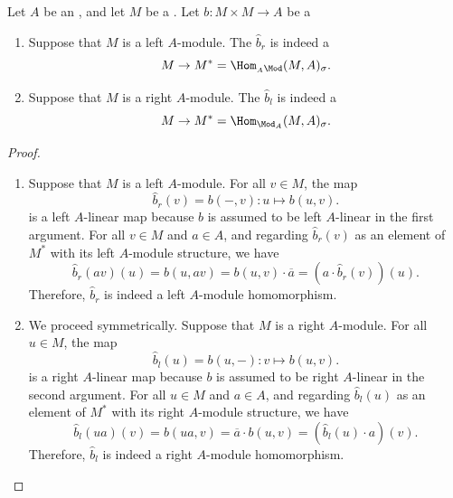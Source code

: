 \begin{lemma} \label{lemma:right_left_adjoint_of_sesquilinear_form_on_a_left_right_module_over_an_involution_ring_is_a_left_right_module_homomorphism_from_module_to_twisted_dual}
    Let $A$ be an , and let $M$ be a . Let $b: M \times M \to A$ be a 
    \begin{enumerate}
        \item Suppose that $M$ is a left $A$-module. The  $\widehat{b}_r$ is indeed a 
        $$M \to M^* = \Hom_{{}_{A}\Mod}(M,A)_\sigma.$$

        \item Suppose that $M$ is a right $A$-module. The  $\widehat{b}_l$ is indeed a 
        $$M \to M^* = \Hom_{\Mod_{A}}(M,A)_\sigma.$$
    \end{enumerate}
\end{lemma}
\begin{proof}
\begin{enumerate}
    \item Suppose that $M$ is a left $A$-module. For all $v \in M$, the map 
    $$\widehat{b}_r(v) = b(-,v): u \mapsto b(u,v).$$
    is a left $A$-linear map because $b$ is assumed to be left $A$-linear in the first argument. For all $v \in M$ and $a \in A$, and regarding $\widehat{b}_r(v)$ as an element of $M^*$ with its left $A$-module structure, we have 
    $$\widehat{b}_r(av)(u) = b(u,av) = b(u, v)\cdot \overline{a} = (a \cdot \widehat{b}_r(v))(u).$$
    Therefore, $\widehat{b}_r$ is indeed a left $A$-module homomorphism.

    \item We proceed symmetrically. Suppose that $M$ is a right $A$-module. For all $u \in M$, the map 
    $$\widehat{b}_l(u) = b(u,-): v \mapsto b(u,v).$$
    is a right $A$-linear map because $b$ is assumed to be right $A$-linear in the second argument. For all $u \in M$ and $a \in A$, and regarding $\widehat{b}_l(u)$ as an element of $M^*$ with its right $A$-module structure, we have 
    $$\widehat{b}_l(ua)(v) = b(ua,v) = \overline{a} \cdot b(u, v) = (\widehat{b}_l(u) \cdot a)(v).$$
    Therefore, $\widehat{b}_l$ is indeed a right $A$-module homomorphism.
\end{enumerate}
\end{proof}
